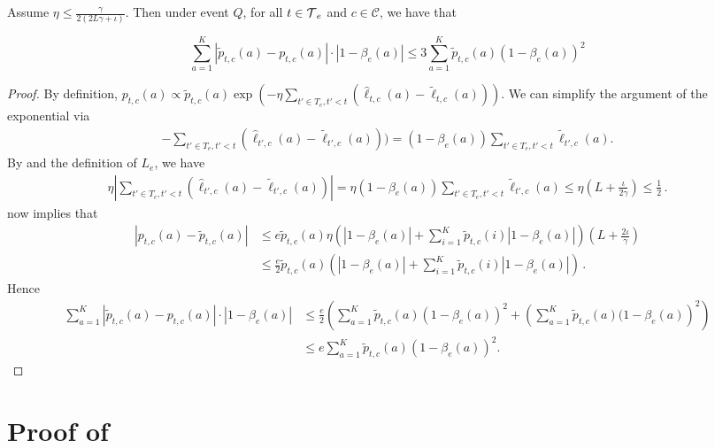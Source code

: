 \begin{lemma}
\label{lem: pure_concentration}
 Assume $\eta \le \frac{\gamma}{2(2 L \gamma+\iota)}$. Then under event $Q$, for all $t \in \operatorname{\mathcal{T}}_e$ and $c \in \mathcal{C}$, we have that

$$
\sum_{a=1}^K\left|\widetilde{p}_{t,c}(a)-p_{t,c}(a)\right| \cdot\left|1-\beta_{e}(a)\right| \le 3 \sum_{a=1}^K \widetilde{p}_{t, c}(a)\left(1-\beta_{e}(a)\right)^2
$$
\begin{proof}
By definition, $p_{t,c}(a)\propto \widetilde{p}_{t,c}(a)\exp(-\eta\sum_{t'\in T_e,t'<t}(\widehat{\ell}_{t,c}(a)-\widetilde{\ell}_{t,c}(a)))$.
We can simplify the argument of the exponential via
\begin{align*}
    -\sum_{t'\in T_e,t'<t}(\widehat{\ell}_{t',c}(a)-\widetilde{\ell}_{t',c}(a)))=(1-\beta_{e}(a))\sum_{t'\in T_e,t'<t}\widetilde{\ell}_{t',c}(a).
\end{align*}
By  and the definition of $L_e$, we have
\begin{align*}
    \eta\left|\sum_{t'\in T_e,t'<t}(\widehat{\ell}_{t',c}(a)-\widetilde{\ell}_{t',c}(a))\right|=\eta(1-\beta_{e}(a))\sum_{t'\in T_e,t'<t}\widetilde{\ell}_{t',c}(a) \le \eta(L+\frac{\iota}{2\gamma}) \le \frac{1}{2}\,.
\end{align*}
 now implies that
\begin{align*}
    |p_{t,c}(a)-\widetilde{p}_{t,c}(a)| &\le e\widetilde{p}_{t,c}(a)\eta\left(|1-\beta_{e}(a)|+\sum_{i=1}^K\widetilde{p}_{t,c}(i)|1-\beta_{e}(a)|\right)\left(L+\frac{2\iota}{\gamma}\right)\\
    &\le \frac{e}{2}\widetilde{p}_{t,c}(a)\left(|1-\beta_{e}(a)|+\sum_{i=1}^K\widetilde{p}_{t,c}(i)|1-\beta_{e}(a)|\right)\,.
\end{align*}
Hence
\begin{align*}
    \sum_{a=1}^K|\widetilde{p}_{t,c}(a)-p_{t,c}(a)|\cdot|1-\beta_{e}(a)| &\le \frac{e}{2}\left(\sum_{a=1}^K\widetilde{p}_{t,c}(a)(1-\beta_{e}(a))^2+\left(\sum_{a=1}^K\widetilde{p}_{t,c}(a)(1-\beta_{e}(a)\right)^2\right)\\
    &\le e\sum_{a=1}^K\widetilde{p}_{t,c}(a)(1-\beta_{e}(a))^2.\tag{Jensen's inequality}
\end{align*}
\end{proof}

\end{lemma}

\section{Proof of }

